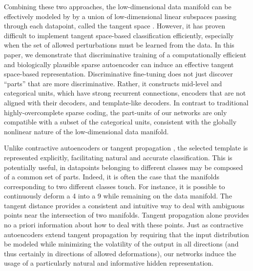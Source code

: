 \documentclass{article} %
\begin{document}
Combining these two approaches, the low-dimensional data manifold can be effectively modeled by by a union of low-dimensional linear subspaces passing through each datapoint, called the tangent space \cite{simard1998, ekanadham2011, rifai2011b}.  
However, it has proven difficult to implement tangent space-based classification efficiently, especially when the set of allowed perturbations must be learned from the data.  In this paper, we demonstrate that discriminative training of a computationally efficient and biologically plausible sparse autoencoder can induce an effective tangent space-based representation.  
Discriminative fine-tuning does not just discover ``parts'' that are more discriminative.  Rather, it constructs mid-level and categorical units, which have strong recurrent connections, encoders that are not aligned with their decoders, and template-like decoders.  In contrast to traditional highly-overcomplete sparse coding, the part-units of our networks are only compatible with a subset of the categorical units, consistent with the globally nonlinear nature of the low-dimensional data manifold.  

Unlike contractive autoencoders \cite{rifai2011a} or tangent propagation \cite{simard1998}, the selected template is represented explicitly, facilitating natural and accurate classification.  This is potentially useful, in datapoints belonging to different classes may be composed of a common set of parts.  Indeed, it is often the case that the manifolds corresponding to two different classes touch.  For instance, it is possible to continuously deform a 4 into a 9 while remaining on the data manifold.  The tangent distance provides a consistent and intuitive way to deal with ambiguous points near the intersection of two manifolds.  Tangent propagation alone provides no a priori information about how to deal with these points.  Just as contractive autoencoders extend tangent propagation by requiring that the input distribution be modeled while minimizing the volatility of the output in all directions (and thus certainly in directions of allowed deformations), our networks induce the usage of a particularly natural and informative hidden representation.  
\end{document}
